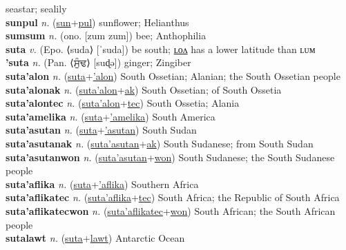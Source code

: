 seastar; sealily \label{suntun} \\
\textbf{sunpul} \textit{n.} (\hyperref[sun]{sun}+\hyperref[pul]{pul})
sunflower; Helianthus \label{sunpul} \\
\textbf{sumsum} \textit{n.} (ono. [zum zum])
bee; Anthophilia \label{sumsum} \\
\textbf{suta} \textit{v.} (Epo. ⟨suda⟩ [ˈsuda])
be south; \hyperref[sutalon]{ʟᴏᴧ} has a lower latitude than ʟᴜᴍ \label{suta} \\
\textbf{'suta} \textit{n.} (Pan. ⟨ਸੁੰਢ⟩ [suɖə])
ginger; Zingiber \label{'suta} \\
\textbf{suta'alon} \textit{n.} (\hyperref[suta]{suta}+\hyperref['alon]{'alon})
South Ossetian; Alanian; the South Ossetian people \label{suta'alon} \\
\textbf{suta'alonak} \textit{n.} (\hyperref[suta'alon]{suta'alon}+\hyperref[ak]{ak})
South Ossetian; of South Ossetia \label{suta'alonak} \\
\textbf{suta'alontec} \textit{n.} (\hyperref[suta'alon]{suta'alon}+\hyperref[tec]{tec})
South Ossetia; Alania \label{suta'alontec} \\
\textbf{suta'amelika} \textit{n.} (\hyperref[suta]{suta}+\hyperref['amelika]{'amelika})
South America \label{suta'amelika} \\
\textbf{suta'asutan} \textit{n.} (\hyperref[suta]{suta}+\hyperref['asutan]{'asutan})
South Sudan \label{suta'asutan} \\
\textbf{suta'asutanak} \textit{n.} (\hyperref[suta'asutan]{suta'asutan}+\hyperref[ak]{ak})
South Sudanese; from South Sudan \label{suta'asutanak} \\
\textbf{suta'asutanwon} \textit{n.} (\hyperref[suta'asutan]{suta'asutan}+\hyperref[won]{won})
South Sudanese; the South Sudanese people \label{suta'asutanwon} \\
\textbf{suta'aflika} \textit{n.} (\hyperref[suta]{suta}+\hyperref['aflika]{'aflika})
Southern Africa \label{suta'aflika} \\
\textbf{suta'aflikatec} \textit{n.} (\hyperref[suta'aflika]{suta'aflika}+\hyperref[tec]{tec})
South Africa; the Republic of South Africa \label{suta'aflikatec} \\
\textbf{suta'aflikatecwon} \textit{n.} (\hyperref[suta'aflikatec]{suta'aflikatec}+\hyperref[won]{won})
South African; the South African people \label{suta'aflikatecwon} \\
\textbf{sutalawt} \textit{n.} (\hyperref[suta]{suta}+\hyperref[lawt]{lawt})
Antarctic Ocean \label{sutalawt} \\
